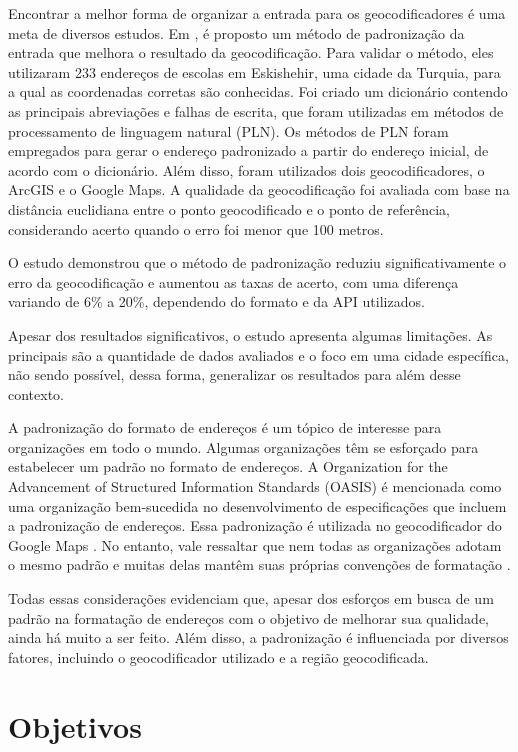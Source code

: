 Encontrar a melhor forma de organizar a entrada para os geocodificadores é uma meta de diversos estudos. Em \cite{KUCUKMATCI2018}, é proposto um método de padronização da entrada que melhora o resultado da geocodificação. Para validar o método, eles utilizaram 233 endereços de escolas em Eskishehir, uma cidade da Turquia, para a qual as coordenadas corretas são conhecidas. Foi criado um dicionário contendo as principais abreviações e falhas de escrita, que foram utilizadas em métodos de processamento de linguagem natural (PLN). Os métodos de PLN foram empregados para gerar o endereço padronizado a partir do endereço inicial, de acordo com o dicionário. Além disso, foram utilizados dois geocodificadores, o ArcGIS e o Google Maps. A qualidade da geocodificação foi avaliada com base na distância euclidiana entre o ponto geocodificado e o ponto de referência, considerando acerto quando o erro foi menor que 100 metros.

O estudo demonstrou que o método de padronização reduziu significativamente o erro da geocodificação e aumentou as taxas de acerto, com uma diferença variando de 6\% a 20\%, dependendo do formato e da API utilizados.

Apesar dos resultados significativos, o estudo apresenta algumas limitações. As principais são a quantidade de dados avaliados e o foco em uma cidade específica, não sendo possível, dessa forma, generalizar os resultados para além desse contexto.

A padronização do formato de endereços é um tópico de interesse para organizações em todo o mundo. Algumas organizações têm se esforçado para estabelecer um padrão no formato de endereços. A Organization for the Advancement of Structured Information Standards (OASIS) é mencionada como uma organização bem-sucedida no desenvolvimento de especificações que incluem a padronização de endereços. Essa padronização é utilizada no geocodificador do Google Maps \cite{GoogleDoc}. No entanto, vale ressaltar que nem todas as organizações adotam o mesmo padrão e muitas delas mantêm suas próprias convenções de formatação \cite{behr2010}.

Todas essas considerações evidenciam que, apesar dos esforços em busca de um padrão na formatação de endereços com o objetivo de melhorar sua qualidade, ainda há muito a ser feito. Além disso, a padronização é influenciada por diversos fatores, incluindo o geocodificador utilizado e a região geocodificada. 

\section{Objetivos}

